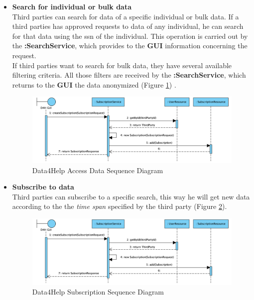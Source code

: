 \documentclass[a4paper, hidelinks, 12pt]{report}
\begin{document}
\begin{itemize}
	\item \textbf{Search for individual or bulk data} \\
	Third parties can search for data of a specific individual or bulk data. If a third parties has approved requests to data of any individual, he can search for that data using the ssn of the individual. This operation is carried out by the \textbf{:SearchService}, which provides to the \textbf{GUI} information concerning the request. \\
	
	If third parties want to search for bulk data, they have several available filtering criteria. All those filters are received by the \textbf{:SearchService}, which returns to the \textbf{GUI} the data anonymized (Figure \ref{fig:d4h_access_data}) .\\ 
	
	\begin{figure}[H]
		\centering
		\includegraphics[width=1\textwidth]{diagrams/sequence_diagrams/d4h_subscribe_to_data.png}
		\caption[Data4Help Access Data Sequence Diagram]{Data4Help Access Data Sequence Diagram}
		\label{fig:d4h_access_data}
	\end{figure}
	
	\item \textbf{Subscribe to data}\\
	Third parties can subscribe to a specific search, this way he will get new data according to the the \textit{time span} specified by the third party (Figure \ref{fig:d4h_subscribe_to_data}).
	
	\begin{figure}[H]
		\centering
		\includegraphics[width=1\textwidth]{diagrams/sequence_diagrams/d4h_subscribe_to_data.png}
		\caption[Data4Help Subscription Sequence Diagram]{Data4Help Subscription Sequence Diagram}
		\label{fig:d4h_subscribe_to_data}
	\end{figure}
	

\end{itemize}
\end{document}
